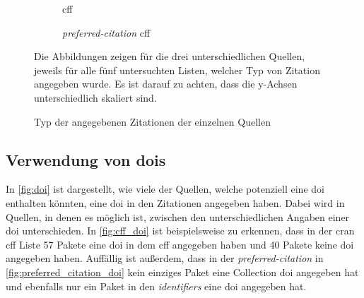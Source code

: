 \begin{figure}
    \begin{subfigure}{.5\textwidth}
        \centering
        
        \caption{\gls{cff}}
        \label{fig:citation_counts_cff}
    \end{subfigure}%
    \begin{subfigure}{.5\textwidth}
        \centering
        
        \caption{\emph{preferred-citation} \gls{cff}}
        \label{fig:citation_counts_preferred_citation_cff}
    \end{subfigure}
    \begin{center}
        \begin{subfigure}{.5\textwidth}
            \centering
            
            \caption{}
            \label{fig:citation_counts_bib}
        \end{subfigure}
    \end{center}
    \caption{Typ der angegebenen Zitationen der einzelnen Quellen}
    \label{fig:citation_counts}
    \small
    Die Abbildungen zeigen für die drei unterschiedlichen Quellen, jeweils für alle fünf untersuchten Listen, welcher Typ von Zitation angegeben wurde. Es ist darauf zu achten, dass die y-Achsen unterschiedlich skaliert sind.
\end{figure}

\subsection*{Verwendung von \gls{doi}s}
In \autoref{fig:doi} ist dargestellt, wie viele der Quellen, welche potenziell eine \gls{doi} enthalten könnten, eine \gls{doi} in den Zitationen angegeben haben.
Dabei wird in Quellen, in denen es möglich ist, zwischen den unterschiedlichen Angaben einer \gls{doi} unterschieden.
In \autoref{fig:cff_doi} ist beispielsweise zu erkennen, dass in der \gls{cran} \gls{cff} Liste 57 Pakete eine \gls{doi} in dem \gls{cff} angegeben haben und 40 Pakete keine \gls{doi} angegeben haben.
Auffällig ist außerdem, dass in der \emph{preferred-citation} in \autoref{fig:preferred_citation_doi} kein einziges Paket eine Collection \gls{doi} angegeben hat und ebenfalls nur ein Paket in den \emph{identifiers} eine \gls{doi} angegeben hat.

